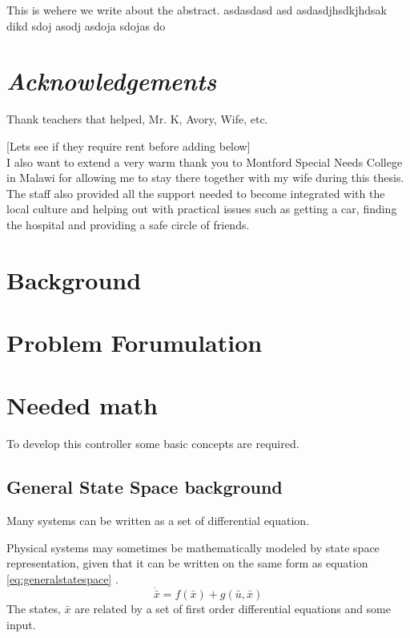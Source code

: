 \documentclass{article}
\begin{document}
\abstract
This is wehere we write about the abstract.
asdasdasd
asd
asdasdjhsdkjhdsak dikd  sdoj asodj asdoja sdojas do

\newpage
\section*{\textit{Acknowledgements}}

Thank teachers that helped, Mr. K, Avory, Wife, etc.

[Lets see if they require rent before adding below]\\
I also want to extend a very warm thank you to Montford Special Needs College in Malawi for allowing me to stay there together with my wife during this thesis.
The staff also provided all the support needed to become integrated with the local culture and helping out with practical issues such as getting a car, finding the hospital and providing a safe circle of friends.

\newpage

\tableofcontents

\newpage

\newpage

\section{Background}


\section{Problem Forumulation}


\section{Needed math}
To develop this controller some basic concepts are required.
\subsection{General State Space background}
Many systems can be written as a set of differential equation.

Physical systems may sometimes be mathematically modeled by state space representation, given that it can be written on the same form as equation \ref{eq:generalstatespace} .
\begin{equation}
    \dot{\bar{x}} = f(\bar{x}) + g(\bar{u},\bar{x})
    \label{eq:generalstatespace}
\end{equation}
The states, $\bar{x}$ are related by a set of first order differential equations and some input.
\end{document}
